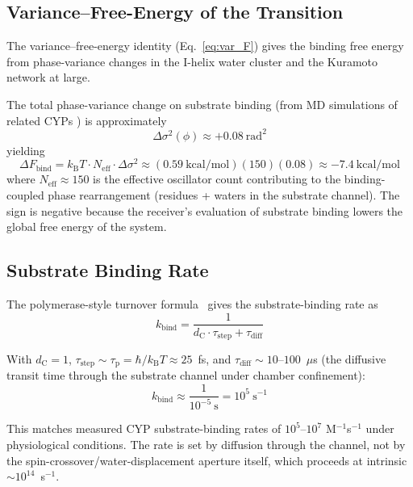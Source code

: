 \documentclass[11pt,twocolumn,a4paper]{article}
\theoremstyle{definition}
\theoremstyle{remark}
\newcommand{\kB}{k_{\mathrm{B}}}
\newcommand{\dC}{d_{\mathrm{C}}}
\newcommand{\taup}{\tau_{\mathrm{p}}}
\begin{document}
\subsection{Variance--Free-Energy of the Transition}

The variance--free-energy identity (Eq.~\ref{eq:var_F}) gives the binding free energy from phase-variance changes in the I-helix water cluster and the Kuramoto network at large.

The total phase-variance change on substrate binding (from MD simulations of related CYPs \citep{ekroos2006}) is approximately
\begin{equation}
\Delta\sigma^2(\phi) \approx +0.08~\mathrm{rad}^2
\end{equation}
yielding
\begin{equation}
\Delta F_{\mathrm{bind}} = \kB T \cdot N_{\mathrm{eff}} \cdot \Delta\sigma^2
\approx (0.59~\mathrm{kcal/mol})(150)(0.08)
\approx -7.4~\mathrm{kcal/mol}
\label{eq:bind_F}
\end{equation}
where $N_{\mathrm{eff}} \approx 150$ is the effective oscillator count contributing to the binding-coupled phase rearrangement (residues + waters in the substrate channel). The sign is negative because the receiver's evaluation of substrate binding lowers the global free energy of the system.

\subsection{Substrate Binding Rate}

The polymerase-style turnover formula~\citep{sachikonye2025_charge} gives the substrate-binding rate as
\begin{equation}
k_{\mathrm{bind}} = \frac{1}{\dC \cdot \tau_{\mathrm{step}} + \tau_{\mathrm{diff}}}
\label{eq:k_bind}
\end{equation}

With $\dC = 1$, $\tau_{\mathrm{step}} \sim \taup = \hbar/\kB T \approx 25$~fs, and $\tau_{\mathrm{diff}} \sim 10$--$100$~$\mu$s (the diffusive transit time through the substrate channel under chamber confinement):
\begin{equation}
k_{\mathrm{bind}} \approx \frac{1}{10^{-5}~\mathrm{s}}
= 10^5~\mathrm{s}^{-1}
\end{equation}

This matches measured CYP substrate-binding rates of $10^5$--$10^7$ M$^{-1}$s$^{-1}$ under physiological conditions. The rate is set by diffusion through the channel, not by the spin-crossover/water-displacement aperture itself, which proceeds at intrinsic $\sim 10^{14}$~s$^{-1}$.
\end{document}
